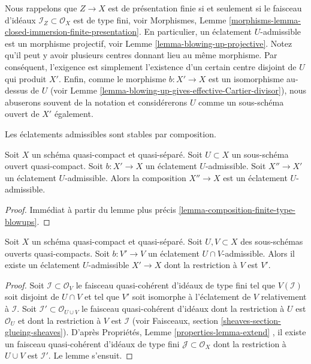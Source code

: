 \noindent
Nous rappelons que  $Z \to X$  est de présentation finie si et seulement si le
faisceau d'idéaux  $\mathcal{I}_Z \subset \mathcal{O}_X$  est de type fini, voir Morphismes, Lemme
 \ref{morphisms-lemma-closed-immersion-finite-presentation}. En particulier, un éclatement  $U$-admissible est un
morphisme projectif, voir Lemme  \ref{lemma-blowing-up-projective}. Notez qu'il peut y avoir plusieurs
centres donnant lieu au même morphisme. Par conséquent, l'exigence est simplement
l'existence d'un certain centre disjoint de  $U$  qui produit  $X'$.
Enfin, comme le morphisme  $b : X' \to X$  est un isomorphisme au-dessus de
 $U$  (voir Lemme  \ref{lemma-blowing-up-gives-effective-Cartier-divisor}), nous abuserons souvent de la notation et
considérerons  $U$  comme un sous-schéma ouvert de  $X'$  également.

\begin{lemma}
\label{lemma-composition-admissible-blowups}
\begin{slogan}
Les éclatements admissibles sont stables par composition.
\end{slogan}
Soit  $X$  un schéma quasi-compact et quasi-séparé. Soit  $U \subset X$  un
sous-schéma ouvert quasi-compact. Soit  $b : X' \to X$  un éclatement
 $U$-admissible. Soit  $X'' \to X'$  un éclatement  $U$-admissible.
Alors la composition  $X'' \to X$  est un éclatement  $U$-admissible.
\end{lemma}

\begin{proof}
Immédiat à partir du lemme plus précis  \ref{lemma-composition-finite-type-blowups}.
\end{proof}

\begin{lemma}
\label{lemma-extend-admissible-blowups}
Soit  $X$  un schéma quasi-compact et quasi-séparé. Soit  $U, V \subset X$  des
sous-schémas ouverts quasi-compacts. Soit  $b : V' \to V$  un éclatement
 $U \cap V$-admissible. Alors il existe un éclatement  $U$-admissible
 $X' \to X$  dont la restriction à  $V$  est  $V'$.
\end{lemma}

\begin{proof}
Soit  $\mathcal{I} \subset \mathcal{O}_V$  le faisceau quasi-cohérent d'idéaux de type fini tel que
 $V(\mathcal{I})$  soit disjoint de  $U \cap V$  et tel que  $V'$  soit isomorphe
à l'éclatement de  $V$  relativement à  $\mathcal{I}$. Soit  $\mathcal{I}' \subset \mathcal{O}_{U \cup V}$  le faisceau
quasi-cohérent d'idéaux dont la restriction à  $U$  est  $\mathcal{O}_U$  et
dont la restriction à  $V$  est  $\mathcal{I}$  (voir Faisceaux, section
 \ref{sheaves-section-glueing-sheaves}). D'après Propriétés, Lemme  \ref{properties-lemma-extend} , il existe un faisceau
quasi-cohérent d'idéaux de type fini  $\mathcal{J} \subset \mathcal{O}_X$  dont la restriction à
 $U \cup V$  est  $\mathcal{I}'$. Le lemme s'ensuit.
\end{proof}

